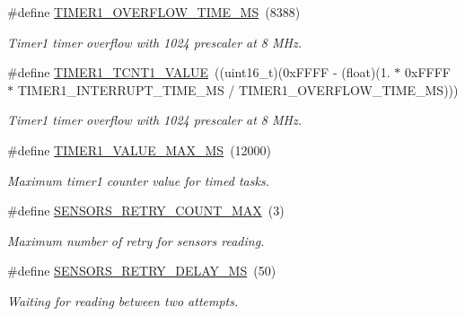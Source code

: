 \begin{DoxyCompactItemize}
\mbox{\label{i2c-th-config_8h_aa4674bad300dfeeb4b9479c5bdc21036}} 
\#define \hyperlink{i2c-th-config_8h_aa4674bad300dfeeb4b9479c5bdc21036}{T\+I\+M\+E\+R1\+\_\+\+O\+V\+E\+R\+F\+L\+O\+W\+\_\+\+T\+I\+M\+E\+\_\+\+MS}~(8388)
\begin{DoxyCompactList}\small\item\em Timer1 timer overflow with 1024 prescaler at 8 M\+Hz. \end{DoxyCompactList}\item 
\mbox{\label{i2c-th-config_8h_a346c738fa798abcc0c070d068da6380f}} 
\#define \hyperlink{i2c-th-config_8h_a346c738fa798abcc0c070d068da6380f}{T\+I\+M\+E\+R1\+\_\+\+T\+C\+N\+T1\+\_\+\+V\+A\+L\+UE}~((uint16\+\_\+t)(0x\+F\+F\+F\+F -\/ (float)(1. $\ast$ 0x\+F\+F\+F\+F $\ast$ T\+I\+M\+E\+R1\+\_\+\+I\+N\+T\+E\+R\+R\+U\+P\+T\+\_\+\+T\+I\+M\+E\+\_\+\+M\+S / T\+I\+M\+E\+R1\+\_\+\+O\+V\+E\+R\+F\+L\+O\+W\+\_\+\+T\+I\+M\+E\+\_\+\+M\+S)))
\begin{DoxyCompactList}\small\item\em Timer1 timer overflow with 1024 prescaler at 8 M\+Hz. \end{DoxyCompactList}\item 
\mbox{\label{i2c-th-config_8h_a988c83777a3764544137ac7493c3d0ac}} 
\#define \hyperlink{i2c-th-config_8h_a988c83777a3764544137ac7493c3d0ac}{T\+I\+M\+E\+R1\+\_\+\+V\+A\+L\+U\+E\+\_\+\+M\+A\+X\+\_\+\+MS}~(12000)
\begin{DoxyCompactList}\small\item\em Maximum timer1 counter value for timed tasks. \end{DoxyCompactList}\item 
\mbox{\label{i2c-th-config_8h_a16fa5577ef44bb1146f17a3bc43194b1}} 
\#define \hyperlink{i2c-th-config_8h_a16fa5577ef44bb1146f17a3bc43194b1}{S\+E\+N\+S\+O\+R\+S\+\_\+\+R\+E\+T\+R\+Y\+\_\+\+C\+O\+U\+N\+T\+\_\+\+M\+AX}~(3)
\begin{DoxyCompactList}\small\item\em Maximum number of retry for sensors reading. \end{DoxyCompactList}\item 
\mbox{\label{i2c-th-config_8h_a8ea8eeea7855628652f697bab3d173b5}} 
\#define \hyperlink{i2c-th-config_8h_a8ea8eeea7855628652f697bab3d173b5}{S\+E\+N\+S\+O\+R\+S\+\_\+\+R\+E\+T\+R\+Y\+\_\+\+D\+E\+L\+A\+Y\+\_\+\+MS}~(50)
\begin{DoxyCompactList}\small\item\em Waiting for reading between two attempts. \end{DoxyCompactList}\end{DoxyCompactItemize}



